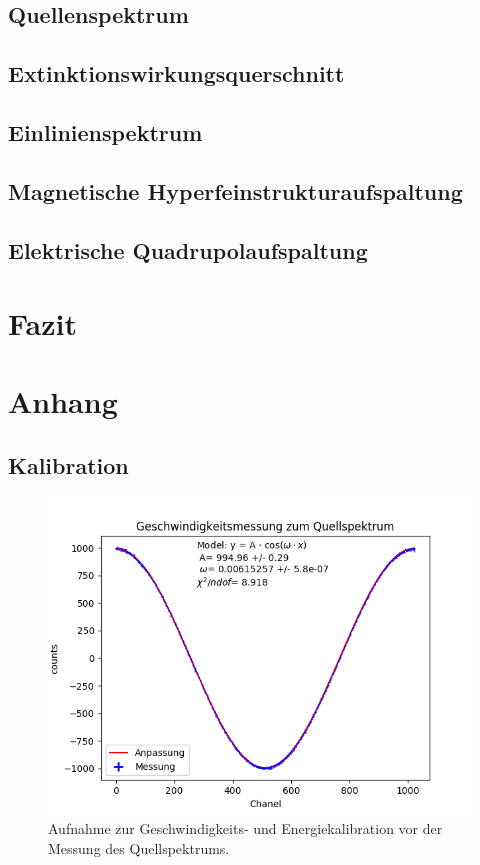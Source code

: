 \documentclass[12pt,a4paper]{article}
\begin{document}
\subsection{Quellenspektrum}
\subsection{Extinktionswirkungsquerschnitt}
\subsection{Einlinienspektrum}
\subsection{Magnetische Hyperfeinstrukturaufspaltung}
\subsection{Elektrische Quadrupolaufspaltung}

\section{Fazit}


\newpage
\section{Anhang}
\subsection{Kalibration}
\begin{figure} [H]
\centering
\includegraphics[scale=0.8]{Bilder/Kalibration/Quellspektrum.png}
\caption{Aufnahme zur Geschwindigkeits- und Energiekalibration vor der Messung des Quellspektrums.}
\end{figure}
\end{document}
